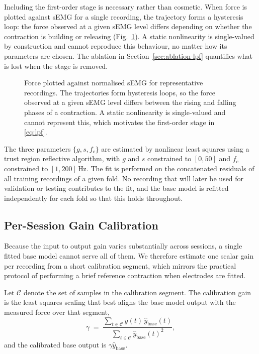 Including the first-order stage is necessary rather than cosmetic. When force is
plotted against sEMG for a single recording, the trajectory forms a hysteresis
loop: the force observed at a given sEMG level differs depending on whether the
contraction is building or releasing (Fig.~\ref{fig:hysteresis}). A static
nonlinearity is single-valued by construction and cannot reproduce this
behaviour, no matter how its parameters are chosen. The ablation in
Section~\ref{sec:ablation-lpf} quantifies what is lost when the stage is removed.

\begin{figure}[!t]
\centering
\caption{Force plotted against normalised sEMG for representative recordings.
The trajectories form hysteresis loops, so the force observed at a given sEMG
level differs between the rising and falling phases of a contraction. A static
nonlinearity is single-valued and cannot represent this, which motivates the
first-order stage in \eqref{eq:lpf}.}
\label{fig:hysteresis}
\end{figure}

The three parameters $\{g, s, f_c\}$ are estimated by nonlinear least squares
using a trust region reflective algorithm, with $g$ and $s$ constrained to
$[0, 50]$ and $f_c$ constrained to $[1, 200]\,\si{\hertz}$. The fit is performed
on the concatenated residuals of all training recordings of a given fold. No
recording that will later be used for validation or testing contributes to the
fit, and the base model is refitted independently for each fold so that this
holds throughout.

\subsection{Per-Session Gain Calibration}
\label{sec:calibration}

Because the input to output gain varies substantially across sessions, a single
fitted base model cannot serve all of them. We therefore estimate one scalar
gain per recording from a short calibration segment, which mirrors the practical
protocol of performing a brief reference contraction when electrodes are fitted.

Let $\mathcal{C}$ denote the set of samples in the calibration segment. The
calibration gain is the least squares scaling that best aligns the base model
output with the measured force over that segment,
\begin{equation}
  \gamma \;=\; \frac{\sum_{t \in \mathcal{C}} y(t)\, \hat{y}_{\mathrm{base}}(t)}
                    {\sum_{t \in \mathcal{C}} \hat{y}_{\mathrm{base}}(t)^2},
  \label{eq:gain}
\end{equation}
and the calibrated base output is $\gamma \hat{y}_{\mathrm{base}}$.


